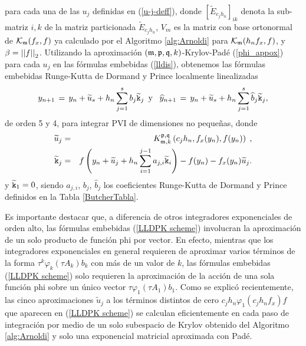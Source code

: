 para cada una de las $u_j$ definidas en (\ref{u-j-deff}),
donde $[\widetilde{E}_{c_jh_n}]_{ik}$ denota la sub-matriz $i,k$ de la matriz particionada $\widetilde{E}_{c_jh_n}$, $V_m$ es la matriz con base ortonormal de $\mathcal{K}_ {\mathfrak{m}}(f_x,f)$ ya calculado por el Algoritmo \ref{alg:Arnoldi} para $\mathcal{K}_{\mathfrak{m}}(h_nf_x,f)$, y $\beta=\left\lvert \left\lvert f \right\rvert  \right\rvert_2$.
Utilizando la aproximación $(\mathfrak{m} , \mathfrak{p} ,\mathfrak{q} , k)$-Krylov-Padé (\ref{phi_appox}) para cada $u_j$ en las fórmulas embebidas (\ref{lldis}), obtenemos las fórmulas embebidas Runge-Kutta de Dormand y Prince localmente linealizadas 
\begin{equation}  \label{LLDPK scheme}
    y_{n+1}\,=\,y_n+\widetilde{u}_s+h_n \sum_{j=1}^{s}b_j \widetilde{\mathtt{k}}_j \,\,\, \text{y} \,\,\, \
    \widehat{y}_{n+1}\,=\, y_n+\widetilde{u}_s+h_n \sum_{j=1}^{s}\widehat{b}_j \widetilde{\mathtt{k}}_j,
\end{equation}
de orden 5 y 4, para integrar PVI de dimensiones no pequeñas, donde
\begin{eqnarray}
	\widetilde{u}_j & = &K_{\mathfrak{m},k}^{\mathfrak{p},\mathfrak{q}}\left( c_jh_n, f_x(y_n) , f(y_n) \right) \;, \label{llrk-uj} \\
    \widetilde{\mathtt{k}}_j & = & f\left( y_n+\widetilde{u}_j+h_n \sum_{i=1}^{j-1}a_{j,i}\widetilde{\mathtt{k}}_i \right) - f( y_n) - f_x(y_n)\widetilde{u}_j. \nonumber
\end{eqnarray}
y $\widetilde{\mathtt{k}}_1=0$, siendo $a_{j,i}$, $b_j$, $\widehat{b}_j$ los coeficientes Runge-Kutta de  Dormand y Prince definidos en la Tabla \ref{ButcherTabla}.

Es importante destacar que, a diferencia de otros integradores exponenciales de orden alto, las fórmulas embebidas (\ref{LLDPK scheme}) involucran la aproximación de un solo producto de función phi por vector. En efecto, mientras que los integradores exponenciales en general requieren de aproximar varios términos de la forma $\tau^k \varphi_k(\tau A_k)b_k$ con más de un valor de $k$, las fórmulas embebidas (\ref{LLDPK scheme}) solo requieren la aproximación de la acción de una sola función phi sobre un único vector $\tau \varphi_1(\tau A_1)b_1$. Como se explicó recientemente, las cinco aproximaciones $\widetilde{u}_j$ a los términos distintos de cero $c_jh_n\varphi_1(c_jh_nf_x)f$ que aparecen en (\ref{LLDPK scheme}) se calculan eficientemente en cada paso de integración por medio de un solo subespacio de Krylov obtenido del Algoritmo \ref{alg:Arnoldi} y solo una exponencial matricial aproximada con Padé.

